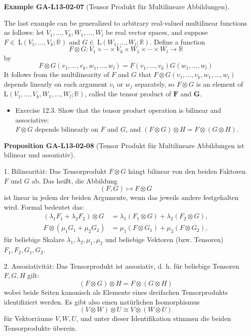 \documentclass[10pt, letterpaper]{article}
\newcommand{\CustomHeading}[3]{%
  \par\medskip\noindent%
  \textbf{#1 #2} \textnormal{(#3)}.\enskip%
}
\newenvironment{PROP}[2]{\begin{unitbox}\CustomHeading{Proposition}{#1}{#2}}{\end{unitbox}}
\newenvironment{EXA}[2]{\begin{unitbox}\CustomHeading{Example}{#1}{#2}}{\end{unitbox}}
\begin{document}
\begin{EXA}{GA-L13-02-07}{Tensor Produkt für Multilineare Abbildungen}
The last example can be generalized to arbitrary real-valued multilinear functions as follows: let $V_{1}, \ldots, V_{k}, W_{1}, \ldots, W_{l}$ be real vector spaces, and suppose $F \in \mathrm{~L}\left(V_{1}, \ldots, V_{k} ; \mathbb{R}\right)$ and $G \in \mathrm{~L}\left(W_{1}, \ldots, W_{l} ; \mathbb{R}\right)$. Define a function
$$
F \otimes G: V_{1} \times \cdots \times V_{k} \times W_{1} \times \cdots \times W_{l} \rightarrow \mathbb{R}
$$
by
$$
F \otimes G\left(v_{1}, \ldots, v_{k}, w_{1}, \ldots, w_{l}\right)=F\left(v_{1}, \ldots, v_{k}\right) G\left(w_{1}, \ldots, w_{l}\right)
$$
It follows from the multilinearity of $F$ and $G$ that $F \otimes G\left(v_{1}, \ldots, v_{k}, w_{1}, \ldots, w_{l}\right)$ depends linearly on each argument $v_{i}$ or $w_{j}$ separately, so $F \otimes G$ is an element of $\mathrm{L}\left(V_{1}, \ldots, V_{k}, W_{1}, \ldots, W_{l} ; \mathbb{R}\right)$, called the tensor product of $\boldsymbol{F}$ and $\boldsymbol{G}$.
\end{EXA}



\begin{itemize}
  \item Exercise 12.3. Show that the tensor product operation is bilinear and associative:\\
  $F \otimes G$ depends bilinearly on $F$ and $G$, and $(F \otimes G) \otimes H=F \otimes(G \otimes H)$.\\
\end{itemize}


\begin{PROP}{GA-L13-02-08}{Tensor Produkt für Multilineare Abbildungen ist bilinear und assoziativ}
1. Bilinearität: Das Tensorprodukt $F \otimes G$ hängt bilinear von den beiden Faktoren $F$ und $G$ ab. Das heißt, die Abbildung
$$
(F, G) \mapsto F \otimes G
$$
ist linear in jedem der beiden Argumente, wenn das jeweils andere festgehalten wird. Formal bedeutet das:
$$
\begin{aligned}
\left(\lambda_1 F_1+\lambda_2 F_2\right) \otimes G & =\lambda_1\left(F_1 \otimes G\right)+\lambda_2\left(F_2 \otimes G\right), \\
F \otimes\left(\mu_1 G_1+\mu_2 G_2\right) & =\mu_1\left(F \otimes G_1\right)+\mu_2\left(F \otimes G_2\right),
\end{aligned}
$$
für beliebige Skalare $\lambda_1, \lambda_2, \mu_1, \mu_2$ und beliebige Vektoren (bzw. Tensoren) $F_1, F_2, G_1, G_2$.

2. Assoziativität: Das Tensorprodukt ist assoziativ, d. h. für beliebige Tensoren $F, G, H$ gilt:
$$
(F \otimes G) \otimes H=F \otimes(G \otimes H)
$$
wobei beide Seiten kanonisch als Elemente eines dreifachen Tensorprodukts identifiziert werden. Es gibt also einen natürlichen Isomorphismus
$$
(V \otimes W) \otimes U \cong V \otimes(W \otimes U)
$$
für Vektorräume $V, W, U$, und unter dieser Identifikation stimmen die beiden Tensorprodukte überein.
\end{PROP}
\end{document}
